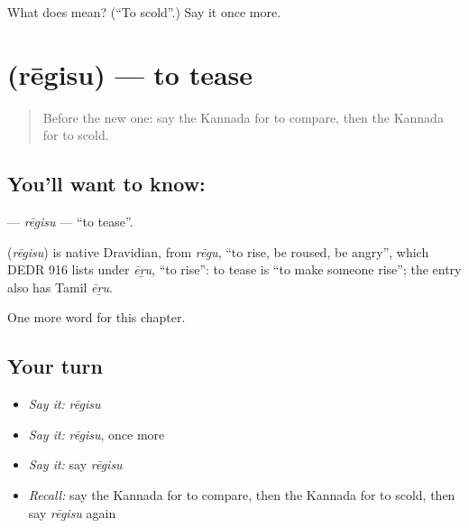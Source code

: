 \begin{tcolorbox}[breakable,colback=teal!4,colframe=teal!35!black,title={Before you move on}]
What does  mean? (\textquotedblleft{}To scold\textquotedblright{}.) Say it once more.
\end{tcolorbox}
\section[\texorpdfstring{\kn{ರೇಗಿಸು} (rēgisu)}{ರೇಗಿಸು (rēgisu)}]{ (rēgisu) — to tease}

\label{lesson:KA-C276-regisu}



\begin{quote}
Before the new one: say the Kannada for to compare, then the Kannada for to scold.
\end{quote}

\subsection*{You'll want to know: }
\textbf{} — \emph{rēgisu} — \textquotedblleft{}to tease\textquotedblright{}.

\begin{cousinweb}
\textbf{} (\emph{rēgisu}) is native Dravidian, from \emph{rēgu}, \textquotedblleft{}to rise, be roused, be angry\textquotedblright{}, which DEDR 916 lists under \emph{ēṟu}, \textquotedblleft{}to rise\textquotedblright{}: to tease is \textquotedblleft{}to make someone rise\textquotedblright{}; the entry also has Tamil \emph{ēṟu}.
\end{cousinweb}

\begin{grammarlens}[title={What you've built}]
One more word for this chapter.
\end{grammarlens}

\subsection*{Your turn}
\begin{itemize}
\raggedright
  \item \emph{Say it:} \emph{rēgisu}
  \item \emph{Say it:} \emph{rēgisu}, once more
  \item \emph{Say it:} say \emph{rēgisu}
  \item \emph{Recall:} say the Kannada for to compare, then the Kannada for to scold, then say \emph{rēgisu} again
\end{itemize}

